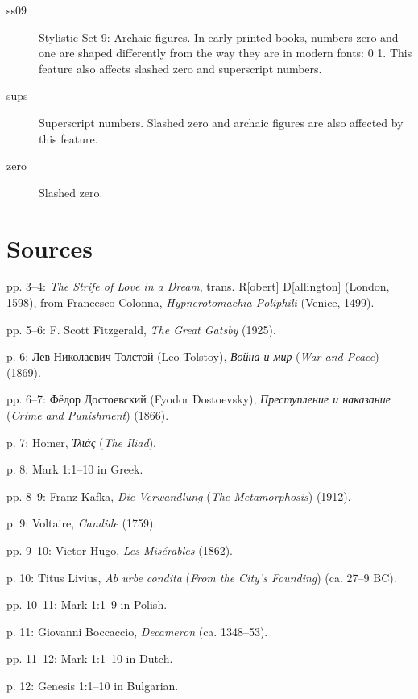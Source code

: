 \documentclass[12pt]{book}
\begin{document}
\begin{description}
\item[ss09] Stylistic Set 9: Archaic figures. In early printed books,
  numbers zero and one are shaped differently from the way they are in
  modern fonts: {0 1}. This feature
  also affects slashed zero and superscript numbers.

\item[sups] Superscript numbers. Slashed zero and archaic figures are also affected by this feature.

\item[zero] Slashed zero.

\end{description}

\section*{Sources}
\begin{hangparas}{.25in}{1}
pp. 3–4: \textit{The Strife of Love in a Dream}, trans. R[obert]
D[allington] (London, 1598), from Francesco Colonna,
\textit{Hypnerotomachia Poliphili} (Venice, 1499).

pp. 5–6: F. Scott Fitzgerald, \textit{The Great Gatsby} (1925).

p. 6: Лев Николаевич Толстой (Leo Tolstoy), \textit{Война и мир} (\textit{War and Peace}) (1869).

pp. 6–7:  Фёдор Достоевский (Fyodor Dostoevsky), \textit{Преступление и наказание} (\textit{Crime and Punishment}) (1866).

p. 7: Homer, \textit{Ἰλιάς} (\textit{The Iliad}).

p. 8: Mark 1:1–10 in Greek.

pp. 8–9: Franz Kafka, \textit{Die Verwandlung} (\textit{The Metamorphosis}) (1912).

p. 9: Voltaire, \textit{Candide} (1759).

pp. 9–10: Victor Hugo, \textit{Les Misérables} (1862).

p. 10: Titus Livius, \textit{Ab urbe condita} (\textit{From the City's
  Founding}) (ca. 27–9 BC).

pp. 10–11: Mark 1:1–9 in Polish.

p. 11: Giovanni Boccaccio, \textit{Decameron} (ca. 1348–53).

pp. 11–12: Mark 1:1–10 in Dutch.

p. 12: Genesis 1:1–10 in Bulgarian.
\end{hangparas}
\end{document}
